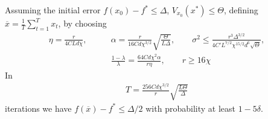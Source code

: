 \begin{theorem}
    Assuming the initial error $f(x_0) - f^* \leq \Delta$, $V_{x_0}(x^*) \leq \Theta$, defining $\overline x = \frac{1}{T}\sum_{t=1}^{T}x_t$, by choosing
    \begin{align*}
        \eta = \frac{r}{4CLd \chi}, \qquad& \alpha = \frac{r}{16 C d\chi^{3/2}} \sqrt{\frac{\Theta}{L\Delta}}, \qquad\sigma^2 \leq \frac{r^3 \Delta^{3/2}}{4C' L^{7/2} \chi^{15/2} d^6 \sqrt{\Theta}},  \\
        &\frac{1-\lambda}{\lambda} = \frac{64Cd \chi^2\alpha}{r \eta}, \qquad r \geq 16\chi
    \end{align*}
    In 
    \begin{align*}
        T=\frac{256 C d \chi^{3/2}}{r} \sqrt{\frac{L\Theta}{\Delta}}
    \end{align*} iterations we have $f(\overline x) - f^* \leq \Delta/2$ with probability at least $1-5\delta$.
\end{theorem}
